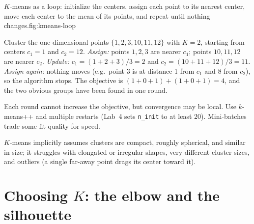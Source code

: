 \begin{utpfig}{$K$-means as a loop: initialize the centers, assign each point to its nearest center, move each center to the mean of its points, and repeat until nothing changes.}{fig:kmeans-loop}
\end{utpfig}

\begin{workedexample}
Cluster the one-dimensional points $\{1,2,3,10,11,12\}$ with $K=2$, starting from centers $c_1=1$ and $c_2=12$.
\emph{Assign:} points $1,2,3$ are nearer $c_1$; points $10,11,12$ are nearer $c_2$.
\emph{Update:} $c_1=(1+2+3)/3=2$ and $c_2=(10+11+12)/3=11$.
\emph{Assign again:} nothing moves (e.g.\ point 3 is at distance 1 from $c_1$ and 8 from $c_2$), so the algorithm stops. The objective is $(1+0+1)+(1+0+1)=4$, and the two obvious groups have been found in one round.
\end{workedexample}

Each round cannot increase the objective, but convergence may be local. Use $k$-means++ and multiple restarts (Lab~4 sets \texttt{n\_init} to at least 20). Mini-batches trade some fit quality for speed.

$K$-means implicitly assumes clusters are compact, roughly spherical, and similar in size; it struggles with elongated or irregular shapes, very different cluster sizes, and outliers (a single far-away point drags its center toward it).

\section{Choosing $K$: the elbow and the silhouette}

